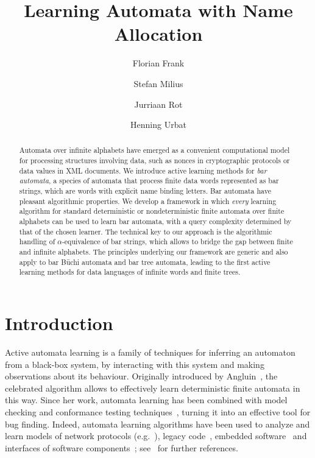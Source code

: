 \documentclass[a4paper,UKenglish,cleveref,autoref,thm-restate,numberwithinsect,final]{lipics-v2021}
\title{Learning Automata with Name Allocation}
\author{Florian Frank}%
{Friedrich-Alexander-Universität Erlangen-Nürnberg, Germany}%
{florian.ff.frank@fau.de}{https://orcid.org/0000-0002-9458-3408}%
{Supported by the Deutsche Forschungsgemeinschaft (DFG) as part of the Research and Training Group 2475 ``Cybercrime and Forensic Computing'' (393541319/GRK2475/2-2024)}
\author{Stefan Milius}
{Friedrich-Alexander-Universität Erlangen-Nürnberg, Germany}
{stefan.milius@fau.de}{https://orcid.org/0000-0002-2021-1644}
{Supported by the DFG (German Research Foundation) -- project number 419850228}
\author{Jurriaan Rot}
{Institute for Computing and Information Sciences, Radboud University, Nijmegen, the Netherlands}
{jrot@cs.ru.nl}{https://orcid.org/0000-0002-1404-6232}
{}
\author{Henning Urbat}
{Friedrich-Alexander-Universität Erlangen-Nürnberg, Germany}
{henning.urbat@fau.de}{https://orcid.org/0000-0002-3265-7168}
{Supported by the DFG (German Research Foundation) -- project number 470467389}
\begin{document}
    \maketitle
    \begin{abstract}
      Automata over infinite alphabets have emerged as a convenient computational model for processing structures involving data, such as nonces in cryptographic protocols or data values in XML documents. We introduce active learning methods for \emph{bar automata}, a species of automata that process finite data words represented as bar strings, which are words with explicit name binding letters. Bar automata have pleasant algorithmic properties. We develop a framework in which \emph{every} learning algorithm for standard deterministic or nondeterministic finite automata over finite alphabets can be used to learn bar automata, with a query complexity determined by that of the chosen learner. The technical key to our approach is the algorithmic handling of $\alpha$-equivalence of bar strings, which allows to bridge the gap between finite and infinite alphabets. The principles underlying our framework are generic and also apply to bar Büchi automata and bar tree automata, leading to the first active learning methods for data languages of infinite words and finite trees.
      \end{abstract}
      
    \section{Introduction}\label{sec:intro}
	
	Active automata learning is a family of techniques for inferring an automaton from a black-box system, by interacting with this system and making observations about its behaviour. 
	Originally introduced by Angluin~\cite{angluin87}, the celebrated \Lstar algorithm allows to effectively learn deterministic finite automata in this way. Since her work, automata learning has been combined with model checking and conformance testing techniques~\cite{DBLP:journals/jalc/PeledVY02}, turning it into an effective tool for bug finding. Indeed, automata learning algorithms have been used to analyze and learn models of network protocols (e.g.~\cite{DBLP:conf/ndss/Fiterau-Brostean23,FiterauEtAl17,FJV16}), legacy code~\cite{AslamCSB20,SHV16}, embedded software~\cite{SmeenkMVJ15} and interfaces of software components~\cite{HowarISBJ12}; see~\cite{DBLP:journals/cacm/Vaandrager17,HowarS16} for further references.
	
\end{document}
